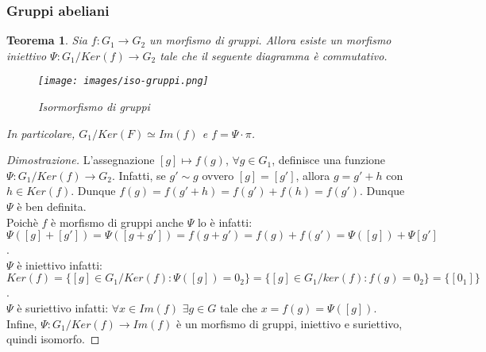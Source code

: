 \documentclass{article}
\theoremstyle{definition}
\theoremstyle{plain}
\theoremstyle{plain}
\theoremstyle{plain}
\newtheorem{teorema}{Teorema}
\theoremstyle{plain}
\begin{document}
\subsubsection*{Gruppi abeliani}
\begin{teorema}\label{teo:iso}
    Sia $f: G_1 \rightarrow G_2$ un morfismo di gruppi. Allora esiste un morfismo iniettivo $\Psi : G_1 / {Ker(f)} \rightarrow G_2$ tale che il seguente diagramma è commutativo.

    \begin{figure}[h]
        \centering
        \texttt{[image: images/iso-gruppi.png]}
        \caption{Isormorfismo di gruppi}
        \label{fig:iso-gruppi}
    \end{figure}
    
    In particolare, $G_1 / {Ker(F)} \simeq Im(f)$ e $f = \Psi \cdot \pi$.
\end{teorema}
\begin{proof}[Dimostrazione]
    L'assegnazione $[g] \mapsto f(g)$, $\forall g \in G_1$, definisce una funzione $\Psi : G_1 / {Ker(f)} \rightarrow G_2$.
    Infatti, se $g' \sim g$ ovvero $[g] = [g']$, allora $g = g' + h$ con $h \in Ker(f)$. Dunque $f(g) = f(g' + h) = f(g') + f(h) = f(g')$. Dunque $\Psi$ è ben definita. \\
    Poichè $f$ è morfismo di gruppi anche $\Psi$ lo è infatti: $\Psi([g] + [g']) = \Psi([g + g']) = f(g + g') = f(g) + f(g') = \Psi([g]) + \Psi[g']$. \\
    $\Psi$ è iniettivo infatti: $Ker(f) = \{[g] \in G_1/Ker(f) : \Psi([g]) = 0_2\} = \{[g] \in G_1/ker(f) : f(g) = 0_2\} = \{[0_1]\}$.\\
    $\Psi$ è suriettivo infatti: $\forall x \in Im(f)$ $\exists g \in G$ tale che $x = f(g) = \Psi([g])$. \\
    Infine, $\Psi : G_1 / {Ker(f)} \rightarrow Im(f)$ è un morfismo di gruppi, iniettivo e suriettivo, quindi isomorfo.
\end{proof}
\end{document}
